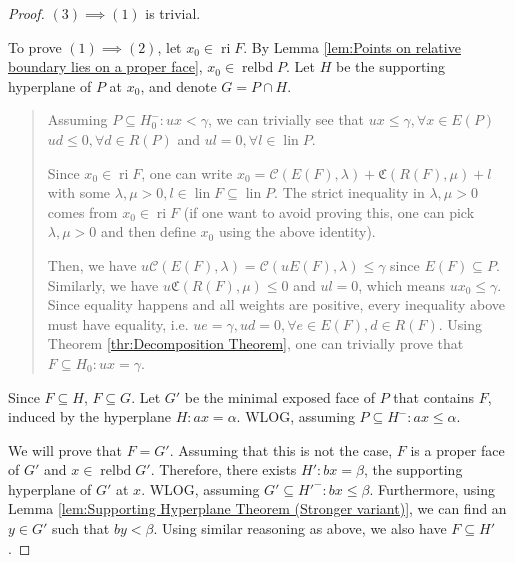 \begin{proof}
  \( (3) \implies (1) \) is trivial.

  To prove \( (1) \implies (2) \), let \( x_{0} \in \operatorname{ri} F \). By
  Lemma \ref{lem:Points on relative boundary lies on a proper face}, \( x_{0} \in
  \operatorname{relbd} P \). Let \( H \) be the supporting hyperplane of \( P \)
  at \( x_{0} \), and denote \( G = P \cap H \).

  \begin{quote}
    Assuming \( P \subseteq H_{0}^{-}: ux <\gamma \), we can trivially see that \(
    ux \le \gamma, \forall  x \in E(P) \) \( ud \le 0, \forall d \in R(P) \) and
    \( ul = 0, \forall  l \in \operatorname{lin} P \).

    Since \( x_{0} \in \operatorname{ri} F \), one can write \( x_{0} =
    \mathcal{C}(E(F), \lambda) + \mathfrak{C}(R(F), \mu) + l \) with some \(
    \lambda, \mu > 0, l \in \operatorname{lin} F \subseteq \operatorname{lin} P
    \). The strict inequality in \( \lambda, \mu > 0 \) comes from \( x_{0} \in
    \operatorname{ri} F\) (if one want to avoid proving this, one can pick \(
    \lambda, \mu > 0 \) and then define \( x_{0} \) using the above identity).

    Then, we have \( u\mathcal{C}(E(F), \lambda) = \mathcal{C}(uE(F), \lambda)
    \le \gamma \) since \( E(F) \subseteq P \). Similarly, we have \(
    u\mathfrak{C}(R(F), \mu) \le 0 \) and \( ul = 0 \), which means \( ux_{0} \le
    \gamma \). Since equality happens and all weights are positive, every
    inequality above must have equality, i.e. \( ue = \gamma, ud = 0, \forall  e
    \in E(F), d \in R(F)\). Using Theorem \ref{thr:Decomposition Theorem}, one
    can trivially prove that \( F \subseteq H_{0}: ux = \gamma \).
  \end{quote}

  Since \( F \subseteq H \), \( F \subseteq G \).
  Let \( G' \) be the minimal exposed face of \( P \) that contains \( F \),
  induced by the hyperplane \( H: ax = \alpha \). WLOG, assuming \( 
  P\subseteq H^{-}: ax \le  \alpha \).

  We will prove that \( F = G' \). Assuming that this
  is not the case, \( F \) is a proper face of \( G' \) and \( x \in
  \operatorname{relbd} G' \). Therefore, there exists \( H': bx = \beta \),
  the supporting hyperplane of \( G' \) at \( x \). WLOG, assuming \( G'
  \subseteq H'^{-}: bx \le \beta \). Furthermore, using Lemma
  \ref{lem:Supporting Hyperplane Theorem (Stronger variant)}, we can find an \(
  y \in G'\) such that \( by < \beta \). Using similar reasoning as above, we
  also have \( F \subseteq H' \).


\end{proof}
